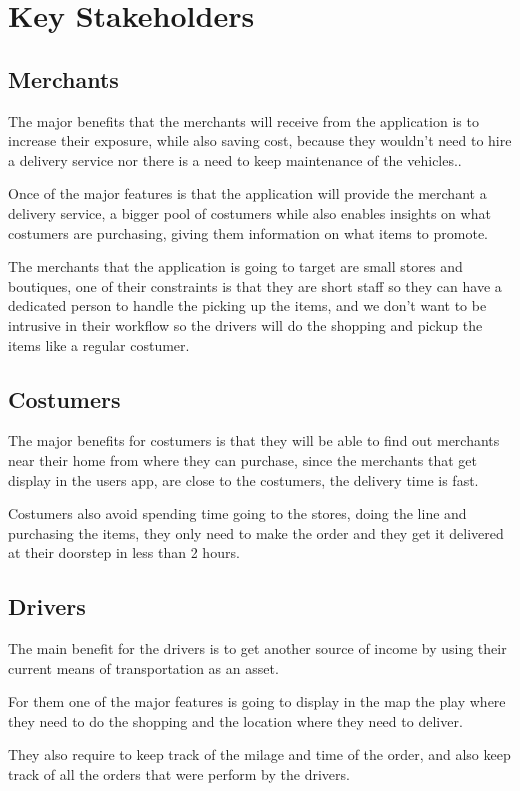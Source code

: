 \section{Key Stakeholders}

\subsection{Merchants}
The major benefits that the merchants will receive from the application is to 
increase their exposure, while also saving cost, because they wouldn't need to 
hire a delivery service nor there is a need to keep maintenance 
of the vehicles..\newline

\noindent Once of the major features is that the application will provide the 
merchant a delivery service, a bigger pool of costumers while also enables 
insights on what costumers are purchasing, giving them information on what 
items to promote.\newline

\noindent The merchants that the application is going to target are small 
stores and boutiques, one of their constraints is that they are short staff so 
they can have a dedicated person to handle the picking up the items, and we 
don’t want to be intrusive in their workflow so the drivers will do the 
shopping and pickup the items like a regular costumer.

\subsection{Costumers}

The major benefits for costumers is that they will be able to find out 
merchants near their home from where they can purchase, since the merchants 
that get display in the users app, are close to the costumers, the delivery 
time is fast.\newline

\noindent Costumers also avoid spending time going to the stores, doing the 
line and purchasing the items, they only need to make the order and they get 
it delivered at their doorstep in less than 2 hours.

\subsection{Drivers}

The main benefit for the drivers is to get another source of income by using 
their current means of transportation as an asset. \newline

\noindent For them one of the major features is going to display in the map 
the play where they need to do the shopping and the location where they need 
to deliver. \newline

\noindent They also require to keep track of the milage and time of the order, 
and also keep track of all the orders that were perform by the drivers.